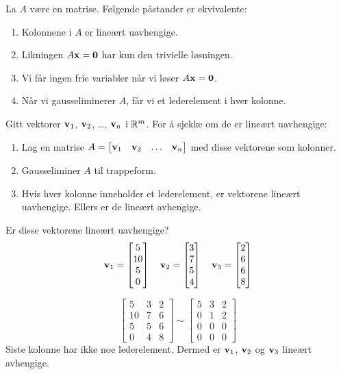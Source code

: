 \begin{thm}
La $A$ være en matrise.  Følgende påstander er ekvivalente:
\begin{enumerate}
\item Kolonnene i $A$ er lineært uavhengige.
\item Likningen $A \mathbf{x} = \mathbf{0}$ har kun den trivielle løsningen.
\item Vi får ingen frie variabler når vi løser $A \mathbf{x} = \mathbf{0}$.
\item Når vi gausseliminerer $A$, får vi et lederelement i hver kolonne.
\end{enumerate}
\end{thm}

Gitt vektorer $\mathbf{v}_1$, $\mathbf{v}_2$, \ldots, $\mathbf{v}_n$ i $\mathbb{R}^m$.  For å
sjekke om de er lineært uavhengige:
\begin{enumerate}
\item Lag en matrise
$A = \begin{bmatrix} \mathbf{v}_1 & \mathbf{v}_2 & \ldots &
\mathbf{v}_n \end{bmatrix}$ med disse vektorene som kolonner.
\item Gausseliminer $A$ til trappeform.
\item Hvis hver kolonne inneholder et lederelement, er vektorene lineært uavhengige.
Ellers er de lineært avhengige.
\end{enumerate}


\begin{ex}
Er disse vektorene lineært uavhengige?
\[
\mathbf{v}_1 = \begin{bmatrix} 5 \\ 10 \\ 5 \\ 0 \end{bmatrix}\quad
\mathbf{v}_2 = \begin{bmatrix} 3 \\ 7 \\ 5 \\ 4 \end{bmatrix}\quad
\mathbf{v}_3 = \begin{bmatrix} 2 \\ 6 \\ 6 \\ 8 \end{bmatrix}
\]

\[
\begin{bmatrix}
5 & 3 & 2 \\
10 & 7 & 6 \\
5 & 5 & 6 \\
0 & 4 & 8
\end{bmatrix}
\sim
\begin{bmatrix}
5 & 3 & 2 \\
0 & 1 & 2 \\
0 & 0 & 0 \\
0 & 0 & 0
\end{bmatrix}
\]
Siste kolonne har ikke noe lederelement.  Dermed er $\mathbf{v}_1$,
$\mathbf{v}_2$ og $\mathbf{v}_3$ lineært avhengige.
\end{ex}


